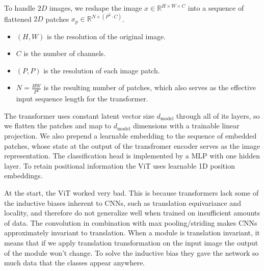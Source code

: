 \documentclass{article}
\begin{document}
To handle $2D$ images, we reshape the image $x \in \mathbb{R}^{H\times W \times C}$ into a sequence of flattened $2D$ patches $x_p \in \mathbb{R}^{N \times (P^2 \cdot C)}$.
\begin{itemize}
  \item $(H, W)$ is the resolution of the original image.
  \item $C$ is the number of channels.
  \item $(P, P)$ is the resolution of each image patch.
  \item $N = \frac{HW}{P^2}$ is the resulting number of patches, which also serves as the effective input sequence length for the transformer.
\end{itemize}

The transformer uses constant latent vector size $d_{\text{model}}$ through all of its layers, so we flatten the patches and map to $d_{\text{model}}$ dimensions with a trainable linear projection.
We also prepend a learnable embedding to the sequence of embedded patches, whose state at the output of the transfromer encoder serves as the image representation.
The classification head is implemented by a MLP with one hidden layer.
To retain positional information the ViT uses learnable 1D position embeddings.

At the start, the ViT worked very bad.
This is because transformers lack some of the inductive biases inherent to CNNs, such as translation equivariance and locality, and therefore do not generalize well when trained on insufficient amounts of data.
The convolution in combination with max pooling/striding makes CNNs approximately invariant to translation.
When a module is translation invariant, it means that if we apply translation transformation on the input image the output of the module won't change.
To solve the inductive bias they gave the network so much data that the classes appear anywhere.
\end{document}
